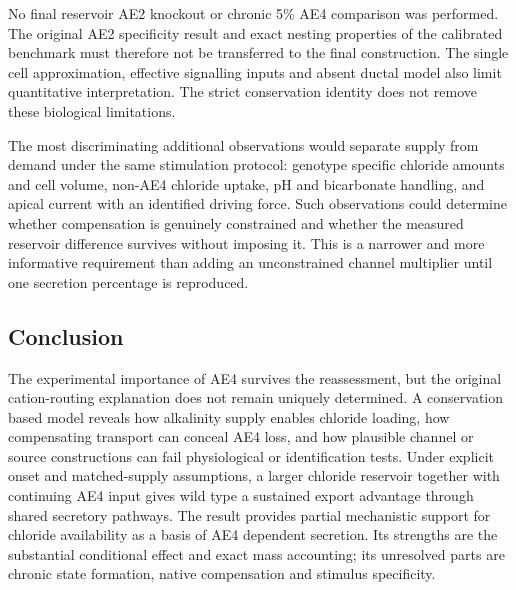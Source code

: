No final reservoir AE2 knockout or chronic 5\% AE4 comparison was performed. The original AE2 specificity result and exact nesting properties of the calibrated benchmark must therefore not be transferred to the final construction. The single cell approximation, effective signalling inputs and absent ductal model also limit quantitative interpretation. The strict conservation identity does not remove these biological limitations.

The most discriminating additional observations would separate supply from demand under the same stimulation protocol: genotype specific chloride amounts and cell volume, non-AE4 chloride uptake, pH and bicarbonate handling, and apical current with an identified driving force. Such observations could determine whether compensation is genuinely constrained and whether the measured reservoir difference survives without imposing it. This is a narrower and more informative requirement than adding an unconstrained channel multiplier until one secretion percentage is reproduced.

\subsection{Conclusion}

The experimental importance of AE4 survives the reassessment, but the original cation-routing explanation does not remain uniquely determined. A conservation based model reveals how alkalinity supply enables chloride loading, how compensating transport can conceal AE4 loss, and how plausible channel or source constructions can fail physiological or identification tests. Under explicit onset and matched-supply assumptions, a larger chloride reservoir together with continuing AE4 input gives wild type a sustained export advantage through shared secretory pathways. The result provides partial mechanistic support for chloride availability as a basis of AE4 dependent secretion. Its strengths are the substantial conditional effect and exact mass accounting; its unresolved parts are chronic state formation, native compensation and stimulus specificity.
